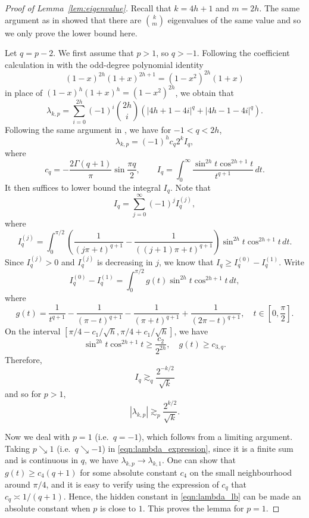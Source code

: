 \documentclass[11pt]{article}
\theoremstyle{remark}
\theoremstyle{definition}
\begin{document}
\begin{proof}[Proof of Lemma~\ref{lem:eigenvalue}]
	Recall that $k=4h+1$ and $m=2h$. 
	The same argument as in \cite{LWW21} showed that there are $\binom{k}{m}$ eigenvalues of the same value and so we only prove the lower bound here. 
	
	Let $q = p-2$. We first assume that $p > 1$, so $q > -1$. Following the coefficient calculation in \cite[Lemma 3.2]{LWW21} with the odd-degree polynomial identity 
	\[
		(1 - x)^{2h} (1 + x)^{2h + 1} = (1 - x^2)^{2h} (1 + x)
	\]
	in place of $(1-x)^h (1+x)^h = (1-x^2)^{2h}$, we obtain that
	\begin{equation}\label{eqn:lambda_expression}
		\lambda_{k,p} = \sum_{i=0}^{2h} (-1)^i \binom{2h}{i} (|4h+1-4i|^q + |4h-1-4i|^q).
	\end{equation}
	Following the same argument in \cite{LWW21}, we have for $-1 < q < 2h$, 
	\[
		\lambda_{k,p} = (-1)^h c_q 2^k I_q,
	\]
	where
	\[
		c_q = -\frac{2\Gamma(q+1)}{\pi}\sin\frac{\pi q}{2},\qquad I_q = \int_0^\infty \frac{\sin^{2h}t \cos^{2h+1}t}{t^{q+1}}\, dt.
	\]
	It then suffices to lower bound the integral $I_q$. Note that
	\[
		I_q = \sum_{j=0}^\infty (-1)^j I_q^{(j)},
	\]
	where
	\[
		I_q^{(j)} = \int_0^{\pi/2} \left(\frac{1}{(j\pi+t)^{q+1}} - \frac{1}{((j+1)\pi+t)^{q+1}}\right) \sin^{2h}t \cos^{2h+1}t \, dt.
	\]
	Since $I_q^{(j)} > 0$ and $I_q^{(j)}$ is decreasing in $j$, we know that $I_q\geq I_q^{(0)} - I_q^{(1)}$. Write
	\[
		I_q^{(0)} - I_q^{(1)} = \int_0^{\pi/2} g(t) \sin^{2h}t \cos^{2h+1}t\, dt,
	\]
	where
	\[
		g(t) = \frac{1}{t^{q+1}} - \frac{1}{(\pi-t)^{q+1}} - \frac{1}{(\pi+t)^{q+1}} + \frac{1}{(2\pi-t)^{q+1}},\quad t\in \left[0,\frac{\pi}{2}\right].
	\]
	On the interval $[\pi/4-c_1/\sqrt{h}, \pi/4+c_1/\sqrt{h}]$, we have
	\[
		\sin^{2h}t \cos^{2h+1}t \geq \frac{c_2}{2^{2h}},\quad g(t)\geq c_{3,q}.
	\]
	Therefore,
	\[
		I_q \gtrsim_q \frac{2^{-k/2}}{\sqrt k}
	\]
	and so for $p>1$,
	\begin{equation}\label{eqn:lambda_lb}
		|\lambda_{k,p}| \gtrsim_p \frac{2^{k/2}}{\sqrt{k}}.
	\end{equation}
	
	Now we deal with $p=1$ (i.e.~$q=-1$), which follows from a limiting argument. Taking $p\searrow 1$ (i.e.~$q\searrow -1$) in \eqref{eqn:lambda_expression}, since it is a finite sum and is continuous in $q$, we have $\lambda_{k,p}\to \lambda_{k,1}$. One can show that $g(t)\geq c_4(q+1)$ for some absolute constant $c_4$ on the small neighbourhood around $\pi/4$, and it is easy to verify using the expression of $c_q$ that $c_q\asymp 1/(q+1)$. Hence, the hidden constant in \eqref{eqn:lambda_lb} can be made an absolute constant when $p$ is close to $1$. This proves the lemma for $p=1$.
\end{proof}
\end{document}
